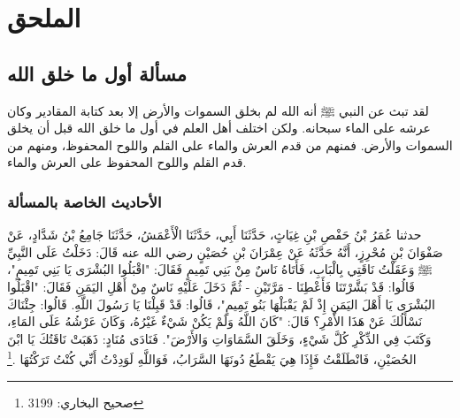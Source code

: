 \chapter{الملحق}
\label{sec:appendix}

\section{مسألة أول ما خلق الله}
\label{sec:app_first_creation}


لقد تبث عن النبي ﷺ أنه الله لم بخلق السموات والأرض إلا بعد كتابة المقادير وكان عرشه على الماء سبحانه. ولكن اختلف أهل العلم في أول ما خلق الله قبل أن يخلق السموات والأرض. فمنهم من قدم العرش والماء على القلم واللوح المحفوظ، ومنهم من قدم القلم واللوح المحفوظ على العرش والماء. 

\subsection{الأحاديث الخاصة بالمسألة}

حدثنا عُمَرُ بْنُ حَفْصِ بْنِ غِيَاثٍ، حَدَّثَنَا أَبِي، حَدَّثَنَا الْأَعْمَشُ، حَدَّثَنَا جَامِعُ بْنُ شَدَّادٍ، عَنْ صَفْوَانَ بْنِ مُحْرِزٍ، أَنَّهُ حَدَّثَهُ عَنْ عِمْرَانَ بْنِ حُصَيْنٍ رضي الله عنه قَالَ: دَخَلْتُ عَلَى النَّبِيِّ ﷺ وَعَقَلْتُ نَاقَتِي بِالْبَابِ، فَأَتَاهُ نَاسٌ مِنْ بَنِي تَمِيمٍ فَقَالَ: "اقْبَلُوا البُشْرَى يَا بَنِي تَمِيمٍ"، قَالُوا: قَدْ بَشَّرْتَنَا فَأَعْطِنَا - مَرَّتَيْنِ - ثُمَّ دَخَلَ عَلَيْهِ نَاسٌ مِنْ أَهْلِ اليَمَنِ فَقَالَ: "اقْبَلُوا البُشْرَى يَا أَهْلَ اليَمَنِ إِذْ لَمْ يَقْبَلْهَا بَنُو تَمِيمٍ"، قَالُوا: قَدْ قَبِلْنَا يَا رَسُولَ اللَّهِ. قَالُوا: جِئْنَاكَ نَسْأَلُكَ عَنْ هَذَا الأَمْرِ؟ قَالَ: "كَانَ اللَّهُ وَلَمْ يَكُنْ شَيْءٌ غَيْرُهُ، وَكَانَ عَرْشُهُ عَلَى المَاءِ، وَكَتَبَ فِي الذِّكْرِ كُلَّ شَيْءٍ، وَخَلَقَ السَّمَاوَاتِ وَالأَرْضَ". فَنَادَى مُنَادٍ: ذَهَبَتْ نَاقَتُكَ يَا ابْنَ الحُصَيْنِ، فَانْطَلَقْتُ فَإِذَا هِيَ يَقْطَعُ دُونَهَا السَّرَابُ، فَوَاللَّهِ لَوَدِدْتُ أَنِّي كُنْتُ تَرَكْتُهَا \href{https://shamela.ws/book/1284/2020#p2}{\faExternalLink} \cite{bukhari}.\footnote{صحيح البخاري: 3199}


